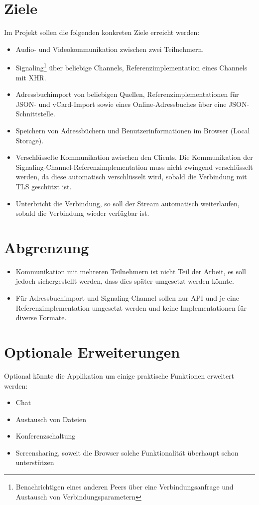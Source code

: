 	\section{Ziele}
		Im Projekt sollen die folgenden konkreten Ziele erreicht werden:
		\begin{itemize}
			\item Audio- und Videokommunikation zwischen zwei Teilnehmern.
			\item Signaling\footnote{Benachrichtigen eines anderen Peers über eine Verbindungsanfrage und Austausch von Verbindungsparametern} über beliebige Channels, Referenzimplementation eines Channels mit XHR.
			\item Adressbuchimport von beliebigen Quellen, Referenzimplementationen für
			JSON- und vCard-Import sowie eines Online-Adressbuches über eine JSON-Schnittstelle.
			\item Speichern von Adressbüchern und Benutzerinformationen im Browser (Local Storage\cite{MDN-LocalStorage}).
			\item Verschlüsselte Kommunikation zwischen den Clients. Die Kommunikation
			der Signaling-Channel-Referenzimplementation muss nicht zwingend
			verschlüsselt werden, da diese automatisch verschlüsselt wird, sobald die
			Verbindung mit TLS geschützt ist.
			\item Unterbricht die Verbindung, so soll der Stream automatisch weiterlaufen, sobald die Verbindung wieder verfügbar ist.
		\end{itemize}
		
	\section{Abgrenzung}
		\begin{itemize}
			\item Kommunikation mit mehreren Teilnehmern ist nicht Teil der Arbeit, es
			soll jedoch sichergestellt werden, dass dies später umgesetzt werden könnte.
			\item Für Adressbuchimport und Signaling-Channel sollen nur API und je eine
			Referenzimplementation umgesetzt werden und keine Implementationen für diverse Formate.
		\end{itemize}
		
		
	\section{Optionale Erweiterungen}
		Optional könnte die Applikation um einige praktische Funktionen erweitert werden:		
		\begin{itemize}
			\item Chat
			\item Austausch von Dateien
			\item Konferenzschaltung
			\item Screensharing, soweit die Browser solche Funktionalität überhaupt schon
			unterstützen
		\end{itemize}
		
